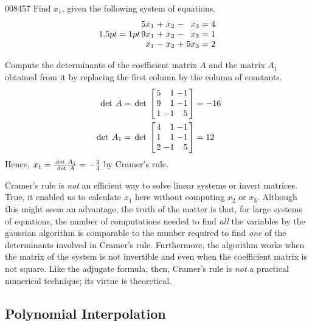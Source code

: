 \begin{example}{}{008457}
Find $x_{1}$, given the following system of equations.
\begin{equation*}
\arraycolsep=1pt
\begin{array}{rrrrrrr}
 	 5x_1 & + & x_2 & - & x_3  & = & 4\\
	9x_1& + & x_2 & - & x_3 & = & 1 \\
	x_1& - & x_2 & + & 5x_3 & = & 2 \\
\end{array}
\end{equation*}
\begin{solution}
  Compute the determinants of the coefficient matrix $A$ and the matrix $A_{1}$ obtained from it by replacing the first column by the column of constants.
\begin{align*}
\func{det } A &= \func{det} \leftB \begin{array}{rrr}
5 & 1 & -1 \\
9 & 1 & -1 \\
1 & -1 & 5 
\end{array}\rightB  = -16 \\
\func{det } A_1 &= \func{det} \leftB \begin{array}{rrr}
4 & 1 & -1 \\
1 & 1 & -1 \\
2 & -1 & 5 
\end{array}\rightB  = 12
\end{align*}
Hence, $x_1 = \tfrac{\thinspace\operatorname{det \medspace} A_1}{\thinspace\operatorname{det \medspace} A} = -\tfrac{3}{4}$
 by Cramer's rule.
\end{solution}
\end{example}

Cramer's rule is \textit{not} an efficient way to solve linear systems or invert matrices. True, it enabled us to calculate $x_{1}$ here without computing $x_{2}$ or $x_{3}$.
 Although this might seem an advantage, the truth of the matter is that,
 for large systems of equations, the number of computations needed to 
find \textit{all} the variables by the gaussian algorithm is comparable to the number required to find \textit{one}
 of the determinants involved in Cramer's rule. Furthermore, the 
algorithm works when the matrix of the system is not invertible and even
 when the coefficient matrix is not square. Like the adjugate formula, 
then, Cramer's rule is \textit{not} a practical numerical technique; its virtue is theoretical.


\subsection*{Polynomial Interpolation}

